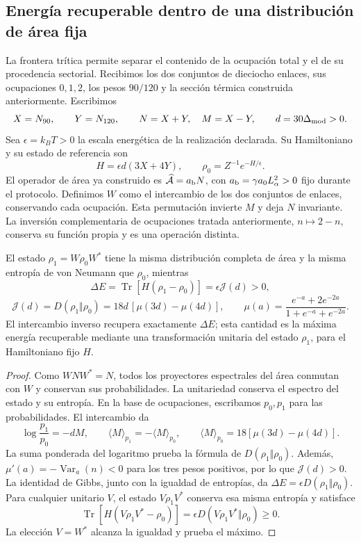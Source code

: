 \subsection{Energía recuperable dentro de una distribución de área fija}
\label{ins29:v:orientacion}

La frontera trítica permite separar el contenido de la ocupación total
y el de su procedencia sectorial. Recibimos los dos conjuntos de
dieciocho enlaces, sus ocupaciones \(0,1,2\), los pesos \(90/120\)
y la sección térmica construida anteriormente. Escribimos
\[
 X=N_{90},\qquad Y=N_{120},\qquad N=X+Y,\quad M=X-Y,
 \qquad d=30\Delta_{\rm mod}>0.
\]
Sea \(\epsilon=k_BT>0\) la escala energética de la realización
declarada. Su Hamiltoniano y su estado de referencia son
\[
 H=\epsilon d(3X+4Y),\qquad
 \rho_0=Z^{-1}e^{-H/\epsilon}.
\]
El operador de área ya construido es
\(\widehat{\mathcal A}=a_{\rm b}N\), con
\(a_{\rm b}=\gamma a_0L_\alpha^2>0\) fijo durante el protocolo.
Definimos \(W\) como el intercambio de los dos conjuntos de enlaces,
conservando cada ocupación. Esta permutación invierte \(M\) y deja
\(N\) invariante. La inversión complementaria de ocupaciones tratada
anteriormente, \(n\mapsto2-n\), conserva su función propia y es una
operación distinta.

\begin{proposition}
\label{ins29:v:respuesta}
El estado \(\rho_1=W\rho_0W^*\) tiene la misma distribución completa
de área y la misma entropía de von Neumann que \(\rho_0\), mientras
\[
 \Delta E=\operatorname{Tr}[H(\rho_1-\rho_0)]
 =\epsilon\mathcal J(d)>0,
\]
\[
 \mathcal J(d)=D(\rho_1\Vert\rho_0)
 =18d\,[\mu(3d)-\mu(4d)],\qquad
 \mu(a)=\frac{e^{-a}+2e^{-2a}}{1+e^{-a}+e^{-2a}}.
\]
El intercambio inverso recupera exactamente \(\Delta E\); esta cantidad
es la máxima energía recuperable mediante una transformación unitaria
del estado \(\rho_1\), para el Hamiltoniano fijo \(H\).
\end{proposition}
\begin{proof}
Como \(WNW^*=N\), todos los proyectores espectrales del área conmutan
con \(W\) y conservan sus probabilidades. La unitariedad conserva el
espectro del estado y su entropía. En la base de ocupaciones, escribamos
\(p_0,p_1\) para las probabilidades. El intercambio da
\[
 \log\frac{p_1}{p_0}=-dM,\qquad
 \langle M\rangle_{p_1}=-\langle M\rangle_{p_0},\qquad
 \langle M\rangle_{p_0}=18[\mu(3d)-\mu(4d)].
\]
La suma ponderada del logaritmo prueba la fórmula de
\(D(\rho_1\Vert\rho_0)\). Además,
\(\mu'(a)=-\operatorname{Var}_a(n)<0\) para los tres pesos positivos,
por lo que \(\mathcal J(d)>0\).
La identidad de Gibbs, junto con la igualdad de entropías, da
\(\Delta E=\epsilon D(\rho_1\Vert\rho_0)\).
Para cualquier unitario \(V\), el estado \(V\rho_1V^*\) conserva esa
misma entropía y satisface
\[
 \operatorname{Tr}[H(V\rho_1V^*-\rho_0)]
 =\epsilon D(V\rho_1V^*\Vert\rho_0)\geq0.
\]
La elección \(V=W^*\) alcanza la igualdad y prueba el máximo.
\end{proof}

